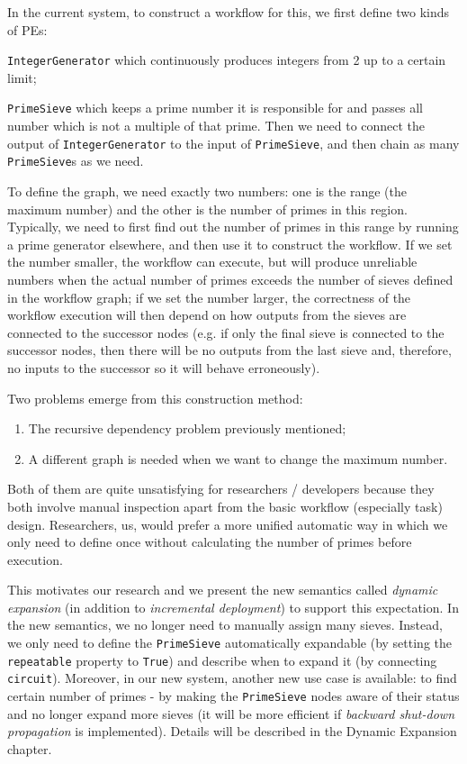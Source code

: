 \newcommand{\cdIntGen}{\lstinline|IntegerGenerator|\xspace}
\newcommand{\cdSieve}{\lstinline|PrimeSieve|\xspace}

In the current \dpy system, to construct a workflow for this, we first define two kinds of PEs:
\begin{enumerate*}
	\item \cdIntGen which continuously produces integers from 2 up to a certain limit;
	\item \cdSieve which keeps a prime number it is responsible for and passes all number which is not a multiple of that prime. Then we need to connect the output of \cdIntGen to the input of \cdSieve , and then chain as many \cdSieve{}s as we need.
\end{enumerate*}

To define the graph, we need exactly two numbers: one is the range (\ie the maximum number) and the other is the number of primes in this region. Typically, we need to first find out the number of primes in this range by running a prime generator elsewhere, and then use it to construct the workflow. If we set the number smaller, the workflow can execute, but will produce unreliable numbers when the actual number of primes exceeds the number of sieves defined in the workflow graph; if we set the number larger, the correctness of the workflow execution will then depend on how outputs from the sieves are connected to the successor nodes (e.g. if only the final sieve is connected to the successor nodes, then there will be no outputs from the last sieve and, therefore, no inputs to the successor so it will behave erroneously).

Two problems emerge from this construction method:
\begin{enumerate}
	\item The recursive dependency problem previously mentioned;
	\item A different graph is needed when we want to change the maximum number.
\end{enumerate}

Both of them are quite unsatisfying for researchers / developers because they both involve manual inspection apart from the basic workflow (especially task) design. Researchers, \eg us, would prefer a more unified automatic way in which we only need to define once without calculating the number of primes before execution.

This motivates our research and we present the new semantics called \emph{dynamic expansion} (in addition to \emph{incremental deployment}) to support this expectation. In the new semantics, we no longer need to manually assign many sieves. Instead, we only need to define the \cdSieve automatically expandable (by setting the \lstinline|repeatable| property to \lstinline|True|) and describe when to expand it (by connecting \lstinline|circuit|). Moreover, in our new system, another new use case is available: to find certain number of primes - by making the \cdSieve nodes aware of their status and no longer expand more sieves (it will be more efficient if \emph{backward shut-down propagation} is implemented). Details will be described in the Dynamic Expansion chapter.

